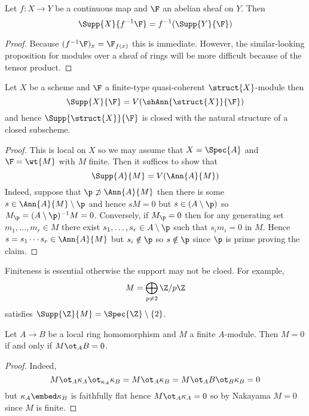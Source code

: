 \documentclass[12pt]{article}
\begin{document}
\begin{prop}
Let $f : X \to Y$ be a continuous map and $\F$ an abelian sheaf on $Y$. Then
\[ \Supp{X}{f^{-1} \F} = f^{-1}(\Supp{Y}{\F}) \]
\end{prop}

\begin{proof}
Because $(f^{-1} \F)_x = \F_{f(x)}$ this is immediate. However, the similar-looking proposition for modules over a sheaf of rings will be more difficult because of the tensor product.
\end{proof}

\begin{prop}
Let $X$ be a scheme and $\F$ a finite-type quasi-coherent $\struct{X}$-module then
\[ \Supp{X}{\F} = V(\shAnn{\struct{X}}{\F}) \]
and hence $\Supp{\struct{X}}{\F}$ is closed with the natural structure of a closed subscheme.
\end{prop}

\begin{proof}
This is local on $X$ so we may assume that $X = \Spec{A}$ and $\F = \wt{M}$ with $M$ finite. Then it suffices to show that
\[ \Supp{A}{M} = V(\Ann{A}{M}) \]
Indeed, suppose that $\p \not\supset \Ann{A}{M}$ then there is some $s \in \Ann{A}{M} \setminus \p$ and hence $s M = 0$ but $s \in (A \setminus \p)$ so $M_\p = (A \setminus \p)^{-1} M = 0$. Conversely, if $M_\p = 0$ then for any generating set $m_1, \dots, m_r \in M$ there exist $s_1, \dots, s_r \in A \setminus \p$ such that $s_i m_i = 0$ in $M$. Hence $s = s_1 \cdots s_r \in \Ann{A}{M}$ but $s_i \notin \p$ so $s \notin \p$ since $\p$ is prime proving the claim.
\end{proof}

\begin{example}
Finiteness is essential otherwise the support may not be cloed. For example,
\[ M = \bigoplus_{p \neq 2} \Z / p \Z \]
satisfies $\Supp{\Z}{M} = \Spec{\Z} \setminus \{ 2 \}$.
\end{example}

\begin{prop}
Let $A \to B$ be a local ring homomorphism and $M$ a finite $A$-module. Then $M = 0$ if and only if $M \ot_A B = 0$.
\end{prop}

\begin{proof}
Indeed, 
\[ M \ot_A \kappa_A \ot_{\kappa_A} \kappa_B = M \ot_A \kappa_B = M \ot_A B \ot_B \kappa_B = 0 \]
but $\kappa_A \embed \kappa_B$ is faithfully flat hence $M \ot_A \kappa_A = 0$ so by Nakayama $M = 0$ since $M$ is finite.
\end{proof}
\end{document}
